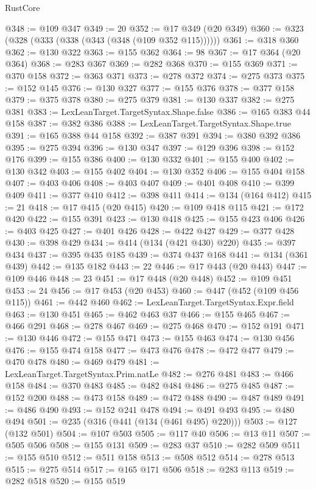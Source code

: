 \begin{lexlean}{RustCore}
\begin{coremodule}
@348 := @109 @347
@349 := 20
@352 := @17 @349 (@20 @349)
@360 := @323 (@328 (@333 (@338 (@343 (@348 (@109 @352 @115))))))
@361 := @318 @360
@362 := @130 @322
@363 := @155 @362
@364 := 98
@367 := @17 @364 (@20 @364)
@368 := @283 @367
@369 := @282 @368
@370 := @155 @369
@371 := @370 @158
@372 := @363 @371
@373 := @278 @372
@374 := @275 @373
@375 := @152 @145
@376 := @130 @327
@377 := @155 @376
@378 := @377 @158
@379 := @375 @378
@380 := @275 @379
@381 := @130 @337
@382 := @275 @381
@383 := LexLeanTarget.TargetSyntax.Shape.false
@386 := @165 @383 @44 @158
@387 := @382 @386
@388 := LexLeanTarget.TargetSyntax.Shape.true
@391 := @165 @388 @44 @158
@392 := @387 @391
@394 := @380 @392 @386
@395 := @275 @394
@396 := @130 @347
@397 := @129 @396
@398 := @152 @176
@399 := @155 @386
@400 := @130 @332
@401 := @155 @400
@402 := @130 @342
@403 := @155 @402
@404 := @130 @352
@406 := @155 @404 @158
@407 := @403 @406
@408 := @403 @407
@409 := @401 @408
@410 := @399 @409
@411 := @377 @410
@412 := @398 @411
@414 := @134 (@164 @412)
@415 := 21
@418 := @17 @415 (@20 @415)
@420 := @109 @418 @115
@421 := @172 @420
@422 := @155 @391
@423 := @130 @418
@425 := @155 @423 @406
@426 := @403 @425
@427 := @401 @426
@428 := @422 @427
@429 := @377 @428
@430 := @398 @429
@434 := @414 (@134 (@421 @430) @220)
@435 := @397 @434
@437 := @395 @435 @185
@439 := @374 @437 @168
@441 := @134 (@361 @439)
@442 := @135 @182
@443 := 22
@446 := @17 @443 (@20 @443)
@447 := @109 @446
@448 := 23
@451 := @17 @448 (@20 @448)
@452 := @109 @451
@453 := 24
@456 := @17 @453 (@20 @453)
@460 := @447 (@452 (@109 @456 @115))
@461 := @442 @460
@462 := LexLeanTarget.TargetSyntax.Expr.field
@463 := @130 @451
@465 := @462 @463 @37
@466 := @155 @465
@467 := @466 @291
@468 := @278 @467
@469 := @275 @468
@470 := @152 @191
@471 := @130 @446
@472 := @155 @471
@473 := @155 @463
@474 := @130 @456
@476 := @155 @474 @158
@477 := @473 @476
@478 := @472 @477
@479 := @470 @478
@480 := @469 @479
@481 := LexLeanTarget.TargetSyntax.Prim.natLe
@482 := @276 @481
@483 := @466 @158
@484 := @370 @483
@485 := @482 @484
@486 := @275 @485
@487 := @152 @200
@488 := @473 @158
@489 := @472 @488
@490 := @487 @489
@491 := @486 @490
@493 := @152 @241 @478
@494 := @491 @493
@495 := @480 @494
@501 := @235 (@316 (@441 (@134 (@461 @495) @220)))
@503 := @127 (@132 @501)
@504 := @107 @503
@505 := @117 @40
@506 := @13 @11
@507 := @505 @506
@508 := @155 @131
@509 := @283 @37
@510 := @282 @509
@511 := @155 @510
@512 := @511 @158
@513 := @508 @512
@514 := @278 @513
@515 := @275 @514
@517 := @165 @171 @506
@518 := @283 @113
@519 := @282 @518
@520 := @155 @519

\end{coremodule}
\end{lexlean}
